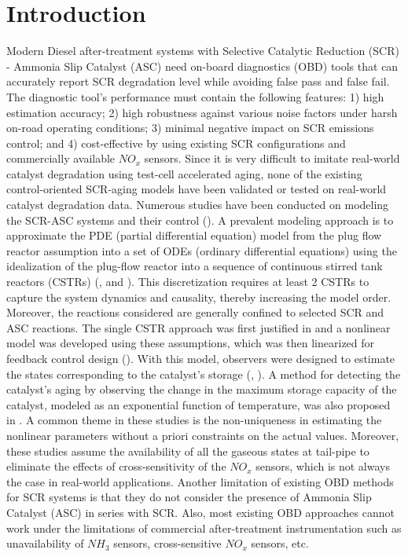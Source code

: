 \chapter{Introduction}

Modern Diesel after-treatment systems with Selective Catalytic Reduction (SCR) - Ammonia Slip Catalyst (ASC) need
on-board diagnostics (OBD) tools that can accurately report SCR degradation level while avoiding false pass and false
fail. The diagnostic tool's performance must contain the following features: 1) high estimation accuracy; 2) high
robustness against various noise factors under harsh on-road operating conditions; 3) minimal negative impact on SCR
emissions control; and 4) cost-effective by using existing SCR configurations and commercially available $NO_x$ sensors.
Since it is very difficult to imitate real-world catalyst degradation using test-cell accelerated aging, none of the
existing control-oriented SCR-aging models have been validated or tested on real-world catalyst degradation data.
Numerous studies have been conducted on modeling the SCR-ASC systems and their control (\cite{yuan2015diesel}). A
prevalent modeling approach is to approximate the PDE (partial differential equation) model from the plug flow reactor
assumption into a set of ODEs (ordinary differential equations) using the idealization of the plug-flow reactor into a
sequence of continuous stirred tank reactors (CSTRs) (\cite{hsieh2011development}, and \cite{nova2014urea}). This
discretization requires at least 2 CSTRs to capture the system dynamics and causality, thereby increasing the model
order. Moreover, the reactions considered are generally confined to selected SCR and ASC reactions. The single CSTR
approach was first justified in \cite{devarakonda2008adequacy} and a nonlinear model was developed using these
assumptions, which was then linearized for feedback control design (\cite{devarakonda2009model}). With this model,
observers were designed to estimate the states corresponding to the catalyst's storage (\cite{ma2017observer},
\cite{jain2020term}). A method for detecting the catalyst's aging by observing the change in the maximum storage
capacity of the catalyst, modeled as an exponential function of temperature, was also proposed in \cite{ma2017observer}.
A common theme in these studies is the non-uniqueness in estimating the nonlinear parameters without a priori
constraints on the actual values. Moreover, these studies assume the availability of all the gaseous states at tail-pipe
to eliminate the effects of cross-sensitivity of the $NO_x$ sensors, which is not always the case in real-world
applications. Another limitation of existing OBD methods for SCR systems is that they do not consider the presence of
Ammonia Slip Catalyst (ASC) in series with SCR. Also, most existing OBD approaches cannot work under the limitations of
commercial after-treatment instrumentation such as unavailability of $NH_3$ sensors, cross-sensitive $NO_x$ sensors,
etc.

